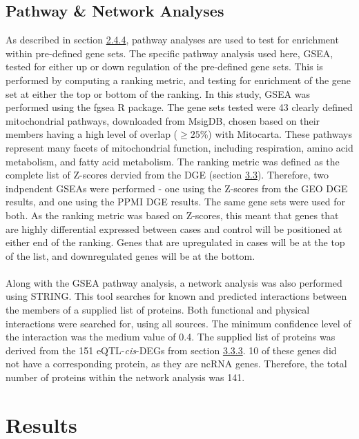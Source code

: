 \documentclass{article}
\begin{document}
\subsection{Pathway \& Network Analyses}
\label{subsec:pathways}
As described in section \hyperref[subsubsec:pathwaysandnetworks]{2.4.4}, pathway analyses are used to test for enrichment within pre-defined gene sets. The specific pathway analysis used here, GSEA, tested for either up or down regulation of the pre-defined gene sets. This is performed by computing a ranking metric, and testing for enrichment of the gene set at either the top or bottom of the ranking. In this study, GSEA was performed using the fgsea\cite{KorotkevichG2019FastAnalysis} R package. The gene sets tested were 43 clearly defined mitochondrial pathways, downloaded from MsigDB\cite{Liberzon2011Molecular3.0}, chosen based on their members having a high level of overlap ($\geq25\%$) with Mitocarta\cite{Rath2021MitoCarta3.0:Annotations}. These pathways represent many facets of mitochondrial function, including respiration, amino acid metabolism, and fatty acid metabolism. The ranking metric was defined as the complete list of Z-scores dervied from the DGE (section \hyperref[subsec:validation]{3.3}). Therefore, two indpendent GSEAs were performed - one using the Z-scores from the GEO DGE results, and one using the PPMI DGE results. The same gene sets were used for both. As the ranking metric was based on Z-scores, this meant that genes that are highly differential expressed between cases and control will be positioned at either end of the ranking. Genes that are upregulated in cases will be at the top of the list, and downregulated genes will be at the bottom. 
\\
\\Along with the GSEA pathway analysis, a network analysis was also performed using STRING\cite{Szklarczyk2023TheInterest}. This tool searches for known and predicted interactions between the members of a supplied list of proteins. Both functional and physical interactions were searched for, using all sources. The minimum confidence level of the interaction was the medium value of 0.4. The supplied list of proteins was derived from the 151 eQTL-\textit{cis}-DEGs from section \hyperref[subsec:validation]{3.3.3}. 10 of these genes did not have a corresponding protein, as they are ncRNA genes. Therefore, the total number of proteins within the network analysis was 141.
\newpage
\section{Results}
\end{document}
